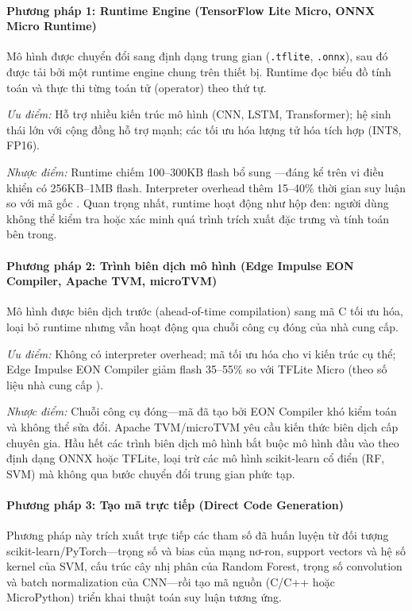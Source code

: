 \paragraph{Phương pháp 1: Runtime Engine (TensorFlow Lite Micro, ONNX Micro Runtime)}
Mô hình được chuyển đổi sang định dạng trung gian (\texttt{.tflite}, \texttt{.onnx}), sau đó được tải bởi một runtime engine chung trên thiết bị. Runtime đọc biểu đồ tính toán và thực thi từng toán tử (operator) theo thứ tự.

\textit{Ưu điểm:} Hỗ trợ nhiều kiến trúc mô hình (CNN, LSTM, Transformer); hệ sinh thái lớn với cộng đồng hỗ trợ mạnh; các tối ưu hóa lượng tử hóa tích hợp (INT8, FP16).

\textit{Nhược điểm:} Runtime chiếm 100--300KB flash bổ sung \cite{warden2019tinyml}---đáng kể trên vi điều khiển có 256KB--1MB flash. Interpreter overhead thêm 15--40\% thời gian suy luận so với mã gốc \cite{lin2022mcunet}. Quan trọng nhất, runtime hoạt động như hộp đen: người dùng không thể kiểm tra hoặc xác minh quá trình trích xuất đặc trưng và tính toán bên trong.

\paragraph{Phương pháp 2: Trình biên dịch mô hình (Edge Impulse EON Compiler, Apache TVM, microTVM)}
Mô hình được biên dịch trước (ahead-of-time compilation) sang mã C tối ưu hóa, loại bỏ runtime nhưng vẫn hoạt động qua chuỗi công cụ đóng của nhà cung cấp.

\textit{Ưu điểm:} Không có interpreter overhead; mã tối ưu hóa cho vi kiến trúc cụ thể; Edge Impulse EON Compiler giảm flash 35--55\% so với TFLite Micro (theo số liệu nhà cung cấp \cite{web:Edge_Impulse}).

\textit{Nhược điểm:} Chuỗi công cụ đóng---mã đã tạo bởi EON Compiler khó kiểm toán và không thể sửa đổi. Apache TVM/microTVM yêu cầu kiến thức biên dịch cấp chuyên gia. Hầu hết các trình biên dịch mô hình bắt buộc mô hình đầu vào theo định dạng ONNX hoặc TFLite, loại trừ các mô hình scikit-learn cổ điển (RF, SVM) mà không qua bước chuyển đổi trung gian phức tạp.

\paragraph{Phương pháp 3: Tạo mã trực tiếp (Direct Code Generation)}
Phương pháp này trích xuất trực tiếp các tham số đã huấn luyện từ đối tượng scikit-learn/PyTorch---trọng số và bias của mạng nơ-ron, support vectors và hệ số kernel của SVM, cấu trúc cây nhị phân của Random Forest, trọng số convolution và batch normalization của CNN---rồi tạo mã nguồn (C/C++ hoặc MicroPython) triển khai thuật toán suy luận tương ứng.

